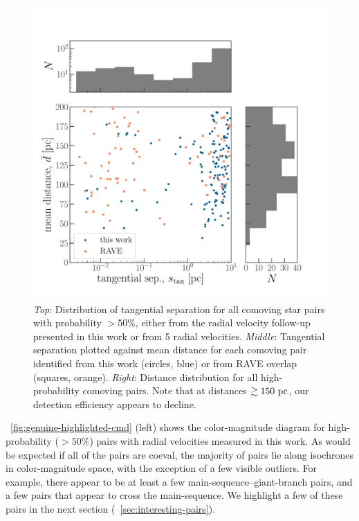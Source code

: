 \documentclass[modern, letterpaper]{aastex61}
\newcommand{\DR}[1]{\acronym{DR}#1}
\begin{document}
\begin{figure}[htb]
  \begin{center}
    \includegraphics[width=0.9\linewidth]{separation-with-rave.pdf}
  \end{center}
  \caption{%
    \emph{Top}: Distribution of tangential separation for all comoving star
      pairs with probability $>50\%$, either from the radial velocity follow-up
      presented in this work or from  \DR{5} radial velocities.
    \emph{Middle}: Tangential separation plotted against mean distance for each
      comoving pair identified from this work (circles, blue) or from RAVE
      overlap (squares, orange).
    \emph{Right}: Distance distribution for all high-probability comoving pairs.
      Note that at distances $\gtrsim 150~\mathrm{pc}$, our detection efficiency appears
      to decline.
    \label{fig:separation-scatter}}
\end{figure}

\figurename~\ref{fig:genuine-highlighted-cmd} (left) shows the color-magnitude
diagram for high-probability ($>50\%$) pairs with radial velocities measured in
this work.
As would be expected if all of the pairs are coeval, the majority of pairs lie
along isochrones in color-magnitude space, with the exception of a few visible
outliers.
For example, there appear to be at least a few main-sequence--giant-branch
pairs, and a few pairs that appear to cross the main-sequence.
We highlight a few of these pairs in the next section
(\sectionname~\ref{sec:interesting-pairs}).
\end{document}
